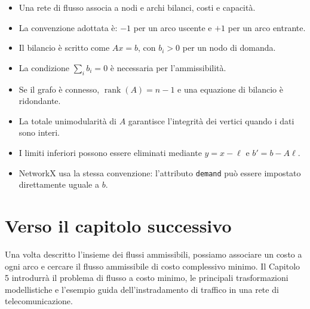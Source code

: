 \documentclass[11pt,a4paper]{article}
\begin{document}
\begin{tcolorbox}[colback=softred,colframe=sapienzared,boxrule=0.8pt,arc=1.5mm]
\begin{itemize}[nosep]
  \item Una rete di flusso associa a nodi e archi bilanci, costi e capacità.
  \item La convenzione adottata è: $-1$ per un arco uscente e $+1$ per un arco entrante.
  \item Il bilancio è scritto come $Ax=b$, con $b_i>0$ per un nodo di domanda.
  \item La condizione $\sum_i b_i=0$ è necessaria per l'ammissibilità.
  \item Se il grafo è connesso, $\operatorname{rank}(A)=n-1$ e una equazione di bilancio è ridondante.
  \item La totale unimodularità di $A$ garantisce l'integrità dei vertici quando i dati sono interi.
  \item I limiti inferiori possono essere eliminati mediante $y=x-\ell$ e $b'=b-A\ell$.
  \item NetworkX usa la stessa convenzione: l'attributo \texttt{demand} può essere impostato direttamente uguale a $b$.
\end{itemize}
\end{tcolorbox}

\section*{Verso il capitolo successivo}

Una volta descritto l'insieme dei flussi ammissibili, possiamo associare un costo a ogni arco e cercare il flusso ammissibile di costo complessivo minimo. Il Capitolo 5 introdurrà il problema di flusso a costo minimo, le principali trasformazioni modellistiche e l'esempio guida dell'instradamento di traffico in una rete di telecomunicazione.
\end{document}
